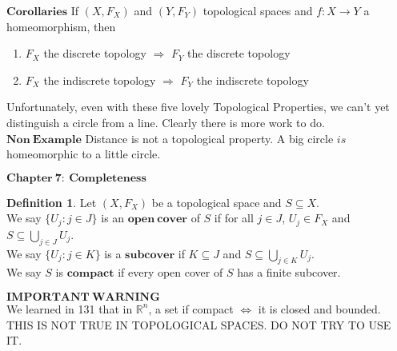 \documentclass[10pt,reqno]{amsart}
\newcommand{\R}{\mathbb{R}}
\newtheorem*{Small Fact}{Small Fact}
\newtheorem*{Small Fact about Basis}{Small Fact about Basis}
\newtheorem*{Tiny Fact about Projection Maps}{Tiny Fact about Projection Maps}
\theoremstyle{definition}
\newtheorem*{Definition}{Definition}
\newtheorem{Analogous Theorem}{Analogous Theorem}
\begin{document}
$\mathbf{Corollaries}$
If $(X, F_X) $ and $(Y, F_Y)$ topological spaces and $f: X \rightarrow Y$ a homeomorphism, then 
\begin{enumerate}
\item $F_X$ the discrete topology $\Longrightarrow$ $F_Y$ the discrete topology
\item $F_X$ the indiscrete topology $\Longrightarrow$ $F_Y$ the indiscrete topology
\end{enumerate}
\vspace{.1in}
Unfortunately, even with these five lovely Topological Properties, we can't yet distinguish a circle from a line. Clearly there is more work to do. \\
\newpage
$\mathbf{Non \ Example}$
Distance is not a topological property. A big circle $is$ homeomorphic to a little circle.\\
\vspace{1in}
\begin{center} $\mathbf{Chapter \ 7: \  Completeness}$ \end{center}
\begin{Definition}
Let $(X, F_X)$ be a topological space and $S \subseteq X$.\\ 
We say $\{U_j : j \in J\}$ is an $\mathbf{open \ cover}$ of $S$ if for all $j \in J$, $U_j \in F_X$ and $S \subseteq \bigcup_{j \in J}U_j$.\\ 
We say $\{U_j : j \in K\}$ is a $\mathbf{subcover}$ if $K \subseteq J$ and $S \subseteq \bigcup_{j \in K} U_j$.\\
We say $S$ is $\mathbf{compact}$ if every open cover of $S$ has a finite subcover. 
\end{Definition}
\vspace{.1in}
$\mathbf{IMPORTANT \ WARNING}$\\
We learned in 131 that in $\R^{n}$, a set if compact $\Longleftrightarrow$ it is closed and bounded. THIS IS NOT TRUE IN TOPOLOGICAL SPACES. DO NOT TRY TO USE IT.
\vspace{.1in}
\bigskip
\end{document}
